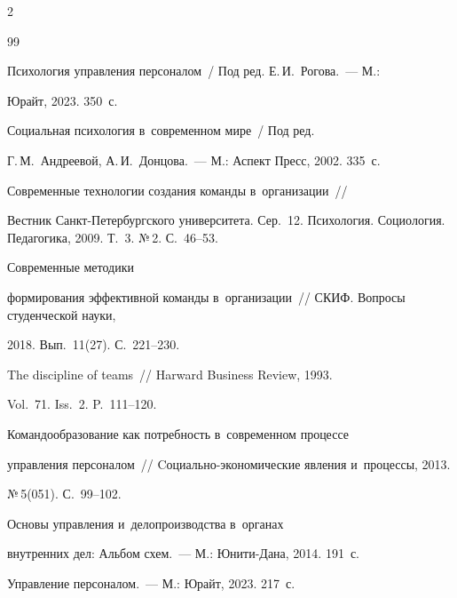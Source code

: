 \begin{multicols}{2}
{{\begin{thebibliography}{99}

Психология управ\-ле\-ния персоналом~/ Под ред. Е.\,И.~Рогова.~--- М.: 

Юрайт, 2023. 350~с.








Социальная психология в~современном мире~/ Под ред. 

Г.\,М.~Андреевой, А.\,И.~Донцова.~--- М.: Аспект Пресс, 2002. 335~с.


 Современные технологии создания команды в~организации~// 

Вестник Санкт-Пе\-тер\-бург\-ско\-го университета. Сер.~12. Психология.  Социология. Педагогика, 2009. Т.~3. №\,2. С.~46--53.




 Современные методики 

формирования эффективной команды в~организации~// СКИФ. Вопросы студенческой науки, 

2018. Вып.~11(27). С.~221--230.




 The discipline of teams~// Harward Business Review, 1993. 

Vol.~71. Iss.~2. P.~111--120.


 Командообразование как потребность в~современном процессе 

управления персоналом~// Cо\-ци\-аль\-но-эко\-но\-ми\-че\-ские явления и~процессы, 2013. 

№\,5(051). С.~99--102. 


 Основы управ\-ле\-ния и~делопроизводства в~органах 

внут\-рен\-них дел: Альбом схем.~--- М.: Юни\-ти-Да\-на, 2014. 191~с.


 Управление персоналом.~--- М.: Юрайт, 2023. 217~с.



\end{thebibliography}}}
\end{multicols}
